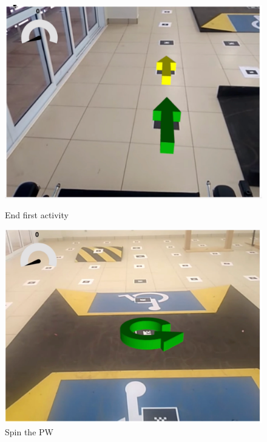\begin{figure}[!htbp]
\center
\begin{minipage}{0.495\linewidth}
\center
\captionsetup{justification=centering,margin=0.5cm,font=small}
\includegraphics[width=1\linewidth]{img/cap6/endFirstAct}
\caption{End first activity} \label{fig:endFirstAct}
\end{minipage}
\begin{minipage}{0.495\linewidth}
\center
\captionsetup{justification=centering,margin=0cm,font=small}
\includegraphics[width=1\linewidth]{img/cap6/spingWAct}
\caption{Spin the PW} \label{fig:spingWAct}
\end{minipage}
\end{figure}


